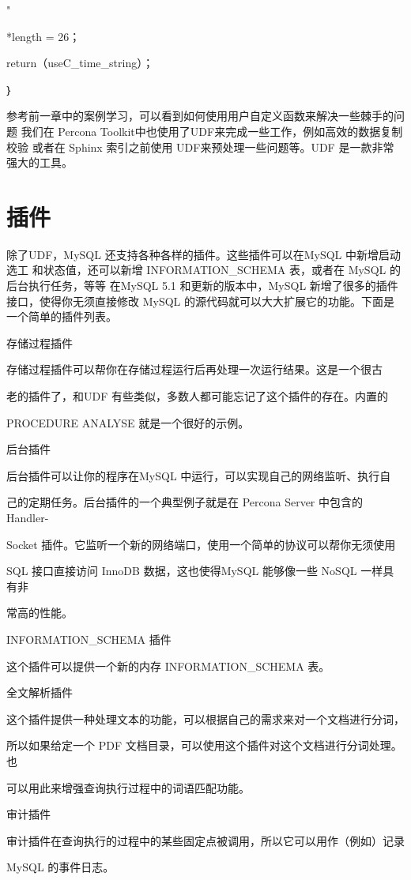 "%

*length = 26；

return（useC\_time\_string）；

｝

参考前一章中的案例学习，可以看到如何使用用户自定义函数来解决一些棘手的问题
我们在 Percona Toolkit中也使用了UDF来完成一些工作，例如高效的数据复制校验
或者在 Sphinx 索引之前使用 UDF来预处理一些问题等。UDF 是一款非常强大的工具。
\section{插件}
除了UDF，MySQL 还支持各种各样的插件。这些插件可以在MySQL 中新增启动选工
和状态值，还可以新增 INFORMATION\_SCHEMA 表，或者在 MySQL 的后台执行任务，等等
在MySQL 5.1 和更新的版本中，MySQL 新增了很多的插件接口，使得你无须直接修改
MySQL 的源代码就可以大大扩展它的功能。下面是一个简单的插件列表。

存储过程插件

存储过程插件可以帮你在存储过程运行后再处理一次运行结果。这是一个很古

老的插件了，和UDF 有些类似，多数人都可能忘记了这个插件的存在。内置的

PROCEDURE ANALYSE 就是一个很好的示例。

后台插件

后台插件可以让你的程序在MySQL 中运行，可以实现自己的网络监听、执行自

己的定期任务。后台插件的一个典型例子就是在 Percona Server 中包含的Handler-

Socket 插件。它监听一个新的网络端口，使用一个简单的协议可以帮你无须使用

SQL 接口直接访问 InnoDB 数据，这也使得MySQL 能够像一些 NoSQL 一样具有非

常高的性能。

INFORMATION\_SCHEMA 插件

这个插件可以提供一个新的内存 INFORMATION\_SCHEMA 表。

全文解析插件

这个插件提供一种处理文本的功能，可以根据自己的需求来对一个文档进行分词，

所以如果给定一个 PDF 文档目录，可以使用这个插件对这个文档进行分词处理。也

可以用此来增强查询执行过程中的词语匹配功能。

审计插件

审计插件在查询执行的过程中的某些固定点被调用，所以它可以用作（例如）记录

MySQL 的事件日志。

